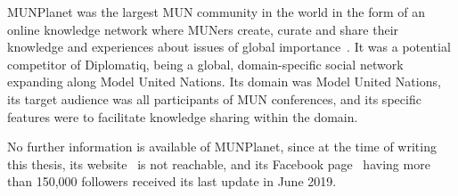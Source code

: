 MUNPlanet was the largest MUN community in the world in the form of an online knowledge network where MUNers create, curate and share their knowledge and experiences about issues of global importance~\cite{munplanetfacebook}. It was a potential competitor of Diplomatiq, being a global, domain-specific social network expanding along Model United Nations. Its domain was Model United Nations, its target audience was all participants of MUN conferences, and its specific features were to facilitate knowledge sharing within the domain.

No further information is available of MUNPlanet, since at the time of writing this thesis, its website~\cite{munplanetwebsite} is not reachable, and its Facebook page~\cite{munplanetfacebook} having more than 150,000 followers received its last update in June 2019.
